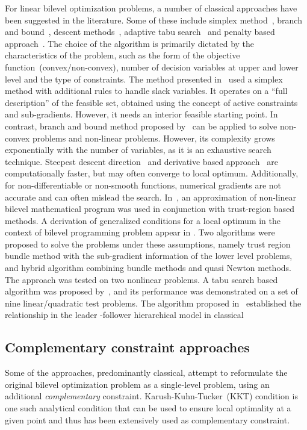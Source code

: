For linear bilevel optimization problems, a number of classical approaches have been suggested in the literature. Some of these include simplex method~\cite{dempe1987simple,onal1993modified}, branch and bound~\cite{bard1982explicit,hansen1992new,bard1990branch}, descent methods~\cite{vicente1994descent,savard1994steepest}, adaptive tabu search~\cite{gendreau1996hybrid} and penalty based approach~\cite{white1993penalty,aiyoshi1984solution,aiyoshi1981hierarchical,ishizuka1992double}. The choice of the algorithm is primarily dictated by the characteristics of the problem, such as the form of the objective function~(convex/non-convex), number of decision variables at upper and lower level and the type of constraints. The method presented in~\cite{dempe1987simple} used a simplex method with additional rules to handle slack variables. It operates on a ``full description'' of the feasible set, obtained using the concept of active constraints and sub-gradients. However, it needs an interior feasible starting point. In contrast, branch and bound method proposed by~\cite{bard1982explicit} can be applied to solve non-convex problems and non-linear problems. However, its complexity grows exponentially with the number of variables, as it is an exhaustive search technique. Steepest descent direction~\cite{savard1994steepest} and derivative based approach~\cite{kolstad1990derivative} are computationally faster, but may often converge to local optimum. Additionally, for non-differentiable or non-smooth functions, numerical gradients are not accurate and can often mislead the search. In~\cite{colson2005trust}, an approximation of non-linear bilevel mathematical program was used in conjunction with trust-region based methods. A derivation of generalized conditions for a local optimum in the context of bilevel programming problem appear in \cite{falk1995bilevel}. Two algorithms were proposed to solve the problems under these assumptions, namely trust region bundle method with the sub-gradient information of the lower level problems, and hybrid algorithm combining bundle methods and quasi Newton methods. The approach was tested on two nonlinear problems. A tabu search based algorithm was proposed by~\cite{rajesh2003tabu}, and its performance was demonstrated on a set of nine linear/quadratic test problems.  The algorithm proposed in~\cite{lai1996hierarchical} established the relationship in the leader -follower hierarchical model in classical 

\subsection{Complementary constraint approaches}
\label{comple_all}
Some of the approaches, predominantly classical, attempt to reformulate the original bilevel optimization problem as a single-level problem, using an additional \textit{complementary} constraint. Karush-Kuhn-Tucker~(KKT) condition is one such analytical condition that can be used to ensure local optimality at a given point and thus has been extensively used as complementary constraint. 

